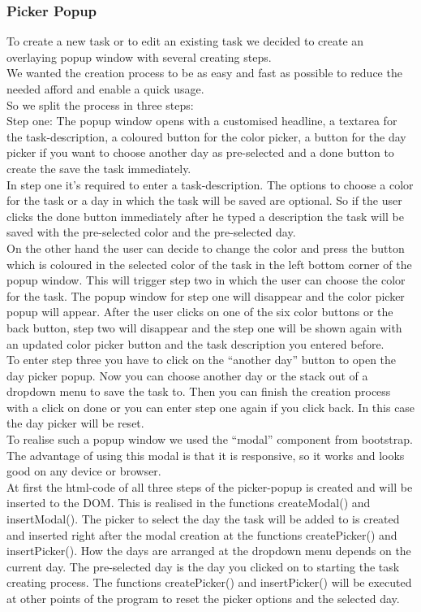\subsubsection{Picker Popup} 
To create a new task or to edit an existing task we decided to create an overlaying popup window with several creating steps. \\
We wanted the creation process to be as easy and fast as possible to reduce the needed afford and enable a quick usage. \\
So we split the process in three steps: \\
Step one: The popup window opens with a customised headline, a textarea for the task-description, a coloured button for the color picker, a button for the day picker if you want to choose another day as pre-selected and a done button to create the save the task immediately. \\
In step one it’s required to enter a task-description. The options to choose a color for the task or a day in which the task will be saved are optional. So if the user clicks the done button immediately after he typed a description the task will be saved with the pre-selected color and the pre-selected day. \\
On the other hand the user can decide to change the color and press the button which is coloured in the selected color of the task in the left bottom corner of the popup window. This will trigger step two in which the user can choose the color for the task. The popup window for step one will disappear and the color picker popup will appear. After the user clicks on one of the six color buttons or the back button, step two will disappear and the step one will be shown again with an updated color picker button and the task description you entered before. \\
To enter step three you have to click on the “another day” button to open the day picker popup. Now you can choose another day or the stack out of a dropdown menu to save the task to. Then you can finish the creation process with a click on done or you can enter step one again if you click back. In this case the day picker will be reset. \\
To realise such a popup window we used the “modal” component from bootstrap. The advantage of using this modal is that it is responsive, so it works and looks good on any device or browser. \\  
At first the html-code of all three steps of the picker-popup is created and will be inserted to the DOM. This is realised in the functions createModal() and insertModal(). The picker to select the day the task will be added to is created and inserted right after the modal creation at the functions createPicker() and insertPicker(). How the days are arranged at the dropdown menu depends on the current day. The pre-selected day is the day you clicked on to starting the task creating process. The functions createPicker() and insertPicker() will be executed at other points of the program to reset the picker options and the selected day. \\
